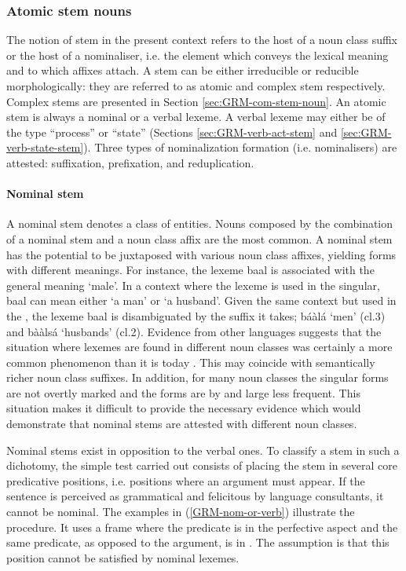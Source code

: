 \begin{exe}
\begin{exe}
\begin{exe}
\begin{exe}
\begin{exe}
\begin{exe}
\subsubsection{Atomic stem nouns}
\label{sec:GRM-sim-bas-noun}

The notion of stem in the present context refers to the host of a noun class suffix or the  host of a nominaliser, i.e. the element which conveys the lexical meaning and  to which affixes attach. A stem can be either irreducible or reducible morphologically: they are referred to as atomic  and complex stem respectively.  Complex stems are presented in  Section \ref{sec:GRM-com-stem-noun}.   An atomic stem is always a  nominal or a verbal lexeme.  A verbal lexeme may either be of the type ``process'' or  ``state'' (Sections \ref{sec:GRM-verb-act-stem} and \ref{sec:GRM-verb-state-stem}). Three types of nominalization formation (i.e. nominalisers) are attested: suffixation, prefixation, and reduplication.  


\largerpage[-1]
\paragraph{Nominal  stem}
\label{sec:GRM-nom-stem}

A nominal stem denotes a class of entities.   Nouns composed by the combination of  a nominal stem and a noun class affix are the most common. A nominal stem has the potential to be juxtaposed with various noun class affixes, yielding forms with different meanings. For instance, the lexeme {\sls baal} is associated with the general meaning `male'. In a context where the lexeme is used in the singular, {\sls baal} can mean either `a man' or `a husband'. Given the same context but used in the , the lexeme {\sls baal} is disambiguated by the  suffix it takes;  {\sls báàlá} `men'  ({\sc cl.3}) and  {\sls bààlsá} `husbands'  ({\sc cl.2}).  Evidence from other  languages suggests that the situation where lexemes are found in different noun classes was certainly a   more common phenomenon than it is today \citep[126--128]{Bonv88}. This may coincide with semantically richer noun class suffixes. In addition, for many noun classes the singular forms are not overtly marked and the  forms are by and large less frequent. This situation makes it difficult to provide the necessary evidence which would demonstrate that nominal stems are attested with different noun classes.  

Nominal stems exist in opposition to the verbal ones. To classify a stem in such a dichotomy, the simple test carried out consists of placing the stem in several core predicative positions, i.e. positions where an argument must appear. If the sentence is perceived as grammatical and felicitous by language consultants, it cannot be nominal.  The examples in (\ref{GRM-nom-or-verb}) illustrate the procedure. It uses a frame where the predicate is in the perfective aspect and  the same predicate, as opposed to the argument,  is in . The assumption is that this position  cannot be satisfied by nominal lexemes.


\end{exe}
\end{exe}
\end{exe}
\end{exe}
\end{exe}
\end{exe}
